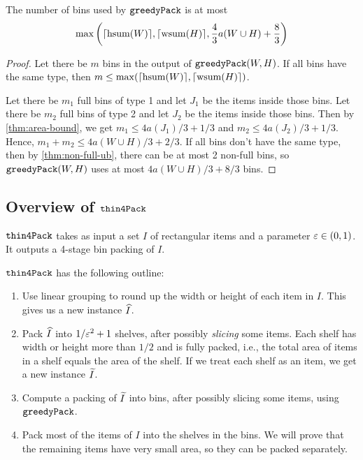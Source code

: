 \begin{theorem}
\label{thm:greedy-pack-bins}
The number of bins used by $\operatorname{\mathtt{greedyPack}}$ is at most
\[ \max\left(\lceil \operatorname{hsum}(W) \rceil, \lceil \operatorname{wsum}(H) \rceil,
    \frac{4}{3}a(W \cup H) + \frac{8}{3}\right) \]
\end{theorem}
\begin{proof}
Let there be $m$ bins in the output of $\operatorname{\mathtt{greedyPack}}(W, H)$.
If all bins have the same type, then $m \le \max(\lceil \operatorname{hsum}(W) \rceil, \lceil \operatorname{wsum}(H) \rceil)$.

Let there be $m_1$ full bins of type 1 and let $J_1$ be the items inside those bins.
Let there be $m_2$ full bins of type 2 and let $J_2$ be the items inside those bins.
Then by \cref{thm:area-bound}, we get $m_1 \le 4a(J_1)/3 + 1/3$ and $m_2 \le 4a(J_2)/3 + 1/3$.
Hence, $m_1 + m_2 \le 4a(W \cup H)/3 + 2/3$.
If all bins don't have the same type, then by \cref{thm:non-full-ub},
there can be at most 2 non-full bins, so $\operatorname{\mathtt{greedyPack}}(W, H)$
uses at most $4a(W \cup H)/3 + 8/3$ bins.
\end{proof}

\subsection{Overview of \texorpdfstring{$\operatorname{\mathtt{thin4Pack}}$}{thin4Pack}}

$\operatorname{\mathtt{thin4Pack}}$ takes as input a set $I$ of rectangular items
and a parameter $\varepsilon \in (0, 1)$.
It outputs a 4-stage bin packing of $I$.

$\operatorname{\mathtt{thin4Pack}}$ has the following outline:
\begin{enumerate}
\item Use linear grouping to round up the width or height of each item in $I$.
    This gives us a new instance $\widehat{I}$.
\item Pack $\widehat{I}$ into $1/\varepsilon^2 + 1$ shelves,
    after possibly \emph{slicing} some items.
    Each shelf has width or height more than $1/2$ and is fully packed, i.e.,
    the total area of items in a shelf equals the area of the shelf.
    If we treat each shelf as an item, we get a new instance $\widetilde{I}$.
\item Compute a packing of $\widetilde{I}$ into bins, after possibly slicing some items,
    using $\operatorname{\mathtt{greedyPack}}$.
\item Pack most of the items of $I$ into the shelves in the bins. We will prove that
    the remaining items have very small area, so they can be packed separately.
\end{enumerate}

